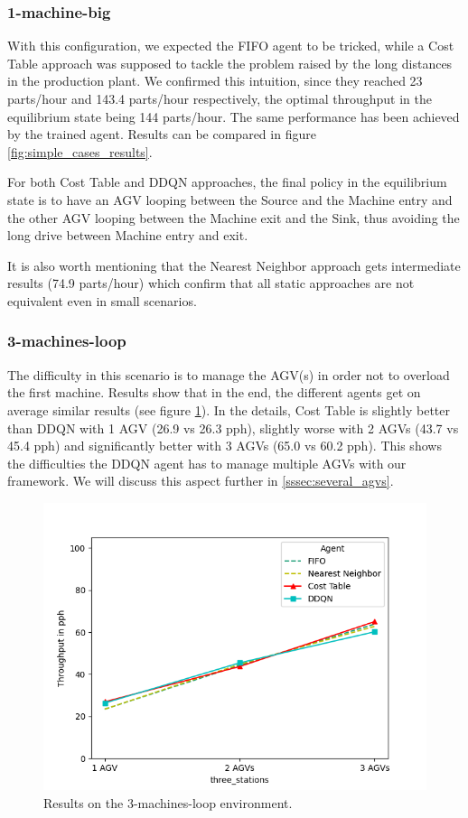 \documentclass[sn-mathphys]{sn-jnl}
\begin{document}
\subsubsection{1-machine-big}

With this configuration, we expected the FIFO agent to be tricked, while a Cost Table approach was supposed to tackle the problem raised by the long distances in the production plant. We confirmed this intuition, since they reached 23 parts/hour and 143.4 parts/hour respectively, the optimal throughput in the equilibrium state being 144 parts/hour. The same performance has been achieved by the trained agent. Results can be compared in figure \ref{fig:simple_cases_results}.

For both Cost Table and DDQN approaches, the final policy in the equilibrium state is to have an AGV looping between the Source and the Machine entry and the other AGV looping between the Machine exit and the Sink, thus avoiding the long drive between Machine entry and exit.

It is also worth mentioning that the Nearest Neighbor approach gets intermediate results (74.9 parts/hour) which confirm that all static approaches are not equivalent even in small scenarios.

\subsubsection{3-machines-loop}

The difficulty in this scenario is to manage the AGV(s) in order not to overload the first machine. Results show that in the end, the different agents get on average similar results (see figure \ref{fig:3_machines_results}). In the details, Cost Table is slightly better than DDQN with 1 AGV (26.9 vs 26.3 pph), slightly worse with 2 AGVs (43.7 vs 45.4 pph) and significantly better with 3 AGVs (65.0 vs 60.2 pph). This shows the difficulties the DDQN agent has to manage multiple AGVs with our framework. We will discuss this aspect further in \ref{sssec:several_agvs}.

\begin{figure}[ht]
  \includegraphics[width=1.0\textwidth]{results_3_machines.png}
  \caption{Results on the $3$-machines-loop environment.}
  \label{fig:3_machines_results}
\end{figure}
\end{document}
